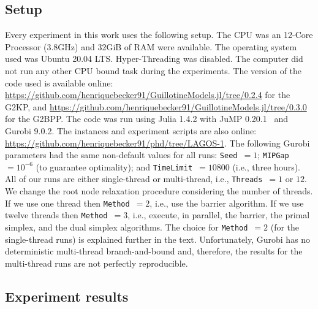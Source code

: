 \documentclass[9pt]{entcs}
\begin{document}
\subsection{Setup}
\label{sec:setup}

Every experiment in this work uses the following setup.
The CPU was an 12-Core Processor (3.8GHz) and 32GiB of RAM were available.
The operating system used was Ubuntu 20.04 LTS.
Hyper-Threading was disabled.
The computer did not run any other CPU bound task during the experiments.
The version of the code used is available online: \url{https://github.com/henriquebecker91/GuillotineModels.jl/tree/0.2.4} for the G2KP, and \url{https://github.com/henriquebecker91/GuillotineModels.jl/tree/0.3.0} for the G2BPP.
The code was run using Julia 1.4.2 with JuMP 0.20.1~\cite{JuMP} and Gurobi 9.0.2.
The instances and experiment scripts are also online: \url{https://github.com/henriquebecker91/phd/tree/LAGOS-1}.
The following Gurobi parameters had the same non-default values for all runs: \verb+Seed+~\(= 1\); \verb+MIPGap+~\(= 10^{-6}\) (to guarantee optimality); and \verb+TimeLimit+~\(= 10800\) (i.e., three hours).
All of our runs are either single-thread or multi-thread, i.e., \verb+Threads+~\(= 1\) or \(12\).
We change the root node relaxation procedure considering the number of threads.
If we use one thread then \verb+Method+~\(= 2\), i.e., use the barrier algorithm.
If we use twelve threads then \verb+Method+~\(= 3\), i.e., execute, in parallel, the barrier, the primal simplex, and the dual simplex algorithms.
The choice for \verb+Method+~\(= 2\) (for the single-thread runs) is explained further in the text.
Unfortunately, Gurobi has no deterministic multi-thread branch-and-bound and, therefore, the results for the multi-thread runs are not perfectly reproducible.

\subsection{Experiment results}
\end{document}
